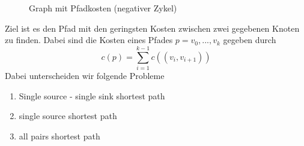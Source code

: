 								\begin{figure}
									\centering
									
									\caption{Graph mit Pfadkosten (negativer Zykel)}
								\end{figure}
                Ziel ist es den Pfad mit den geringsten Kosten zwischen zwei gegebenen Knoten zu finden. Dabei sind die Kosten eines Pfades $p= v_0,...,v_k$  gegeben durch 
                $$
                    c(p) = \sum_{i=1}^{k-1}{c((v_i,v_{i+1}))}
                $$
                Dabei unterscheiden wir folgende Probleme
                \begin{enumerate}
                    \item Single source - single sink shortest path
                    \item single source shortest path
                    \item all pairs shortest path
                \end{enumerate}
                
